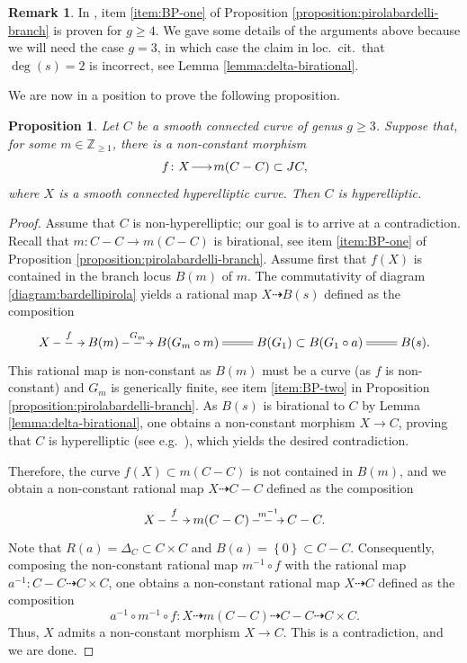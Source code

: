 \documentclass[a4paper,11pt,reqno]{amsart}
\makeatletter
\numberwithin{equation}{section}
\theoremstyle{plain}
\newtheorem{proposition}[theorem]{Proposition}
\theoremstyle{definition}
\newtheorem{remark}[theorem]{Remark}
\newcommand{\Z}{\mathbb Z}
\renewcommand{\longrightarrow}{\xymatrix@1@=15pt{\ar[r]&}}
\newcommand{\set}[1]{\left\{ #1 \right\}}
\makeatother
\begin{document}
\begin{remark} \label{remark:NP-error-twelve}
In \cite{naranjopirola2018}, item \eqref{item:BP-one} of Proposition \ref{proposition:pirolabardelli-branch} is proven for $ g \geq 4$. 
We gave some details of the arguments above because we will need the case $g=3$, in which case the claim in loc.\ cit.\ that $\deg(s) = 2$ is incorrect, see Lemma \ref{lemma:delta-birational}. 
\end{remark}

We are now in a position to prove the following proposition. 

\begin{proposition} \label{proposition:hyperelliptic-gauss} 
Let $C$ be a smooth connected curve of genus $g \geq 3$. Suppose that, for some $m \in \Z_{\geq 1}$, there is a non-constant morphism 
\[
f \colon X \longrightarrow m(C - C)\subset JC,
\]
where $X$ is a smooth connected hyperelliptic curve. Then $C$ is hyperelliptic. 
\end{proposition}
\begin{proof} 
Assume that $C$ is non-hyperelliptic; our goal is to arrive at a contradiction.  
Recall that $m \colon C - C \to m(C-C)$ is birational, see item \eqref{item:BP-one} of Proposition \ref{proposition:pirolabardelli-branch}.  
Assume first that $f(X)$ is contained in the branch locus $B(m)$ of $m$. The commutativity of diagram \eqref{diagram:bardellipirola} yields a rational map $X \dashrightarrow B(s)$ defined as the composition 
\[
\xymatrix{
X \ar@{-->}[r]^-f & B(m) 
\ar@{-->}[r]^-{G_m}  & B(G_m \circ m) \ar@{=}[r] & B(G_1) \subset B(G_1 \circ a) \ar@{=}[r]&  B(s).
}
\]
This rational map is non-constant as $B(m)$ must be a curve (as $f$ is non-constant) and $G_m$ is generically finite, see item \eqref{item:BP-two} in Proposition \ref{proposition:pirolabardelli-branch}.  
As $B(s)$ is birational to $C$ by Lemma \ref{lemma:delta-birational}, one obtains a non-constant morphism $X \to C$, proving that $C$ is hyperelliptic (see e.g.~\cite[Lemma 1.1]{schoen-hyperelliptic}), which yields the desired contradiction.

Therefore, the curve $f(X) \subset m(C-C)$ is not contained in $B(m)$, and we obtain a non-constant rational map $X \dashrightarrow C - C$ defined as the composition
\[
\xymatrix{
X 
\ar@{-->}[r]^-f
&
m(C-C) 
\ar@{-->}[r]^-{m^{-1}} &
C - C. 
}
\]
Note that $R(a) = \Delta_C \subset C \times C$ and $B(a) = \set{0} \subset C - C$. 
Consequently, composing the non-constant rational map $m^{-1} \circ f$ with the rational map $a^{-1} \colon C - C \dashrightarrow C \times C$, one  
obtains a non-constant rational map 
$X \dashrightarrow C$ defined as the composition 
\[
a^{-1} \circ m^{-1} \circ f \colon X \dashrightarrow m(C - C) \dashrightarrow C - C \dashrightarrow C \times C.
\]
Thus, $X$ admits a non-constant morphism $X \to C$. This is a contradiction, and we are done. \end{proof}
\end{document}
